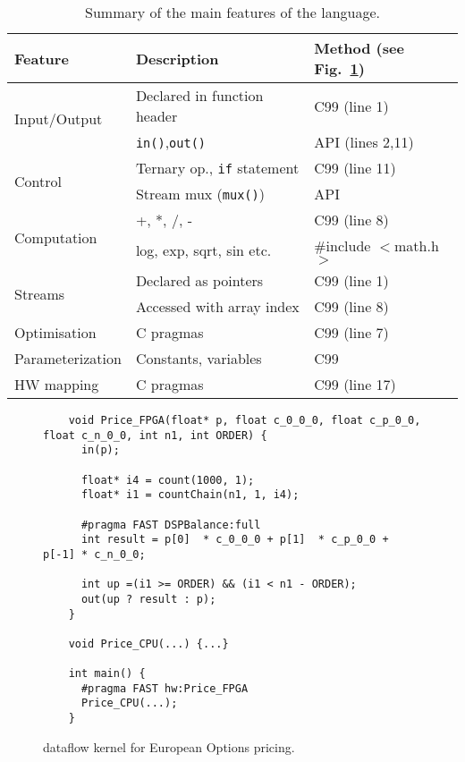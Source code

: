 \begin{table}[!h]
  \centering
\renewcommand{\arraystretch}{1.6}
\caption{Summary of the main features of the \MAXC{} language.}
\label{table:maxc-features}
\begin{tabular}{l|l|l}
\hline
\bf{Feature}                   & \bf{Description}                   & \bf{Method (see Fig.~\ref{fig:maxc-1dconv})} \\
\hline\hline
  \multirow{2}{*}{Input/Output}         & Declared in function header          & C99 (line 1)                                 \\\cline{2-3}       & \texttt{in()},\texttt{out()}  & \MAXC{} API (lines 2,11) \\
\hline
  \multirow{2}{*}{Control}     & Ternary op., \texttt{if} statement & C99 (line 11)                                \\\cline{2-3}      & Stream mux (\texttt{mux()})       & \MAXC{} API  \\
\hline
\multirow{2}{*}{Computation} & +, *, /, -                         & C99 (line 8)                           \\\cline{2-3} & log, exp, sqrt, sin etc.  & \#include $<$math.h$>$  \\
\hline
  \multirow{2}{*}{Streams}     & Declared as pointers               & C99 (line 1)                                 \\\cline{2-3}       & Accessed with array index & C99 (line 8) \\
\hline
  Optimisation                 & C pragmas                   & C99 (line 7)                                 \\
\hline
  Parameterization             & Constants, variables                   & C99                                          \\
\hline
HW mapping                  & C pragmas                   & C99 (line 17)                                \\
\end{tabular}
\end{table}



\lstset{style=MaxC}

\begin{figure}[!h]
  \begin{lstlisting}
    void Price_FPGA(float* p, float c_0_0_0, float c_p_0_0, float c_n_0_0, int n1, int ORDER) {
      in(p);

      float* i4 = count(1000, 1);
      float* i1 = countChain(n1, 1, i4);

      #pragma FAST DSPBalance:full
      int result = p[0]  * c_0_0_0 + p[1]  * c_p_0_0 + p[-1] * c_n_0_0;

      int up =(i1 >= ORDER) && (i1 < n1 - ORDER);
      out(up ? result : p);
    }

    void Price_CPU(...) {...}

    int main() {
      #pragma FAST hw:Price_FPGA
      Price_CPU(...);
    }
  \end{lstlisting}
  \caption{\MAXC{} dataflow kernel for European Options
    pricing.}
  \label{fig:maxc-1dconv}
\end{figure}


